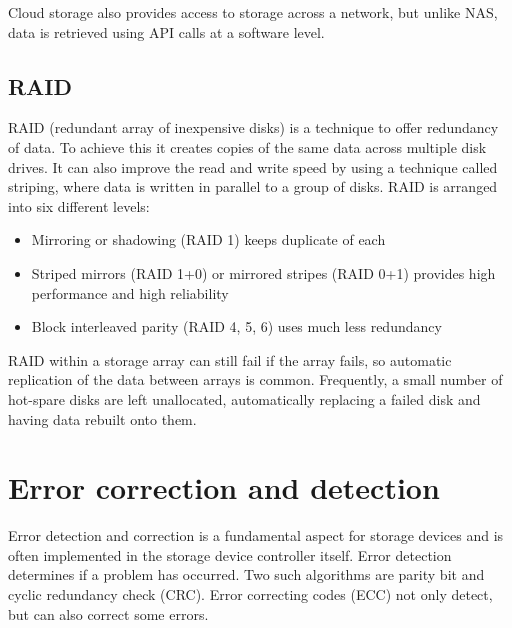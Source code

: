 Cloud storage also provides access to storage across a network, but unlike NAS, data is retrieved using API calls at a software level.

\subsection{RAID}
RAID (redundant array of inexpensive disks) is a technique to offer redundancy of data. To achieve this it creates copies of the same data across multiple disk drives. It can also improve the read and write speed by using a technique called striping, where data is written in parallel to a group of disks. RAID is arranged into six different levels:
\begin{itemize}
    \item Mirroring or shadowing (RAID 1) keeps duplicate of each
    \item Striped mirrors (RAID 1+0) or mirrored stripes (RAID 0+1) provides high performance and high reliability
    \item Block interleaved parity (RAID 4, 5, 6) uses much less redundancy
\end{itemize}
RAID within a storage array can still fail if the array fails, so automatic replication of the data between arrays is common. Frequently, a small number of hot-spare disks are left unallocated, automatically replacing a failed disk and having data rebuilt onto them.

\section{Error correction and detection}
Error detection and correction is a fundamental aspect for storage devices and is often implemented in the storage device controller itself. Error detection determines if a problem has occurred. Two such algorithms are parity bit and cyclic redundancy check (CRC). Error correcting codes (ECC) not only detect, but can also correct some errors.